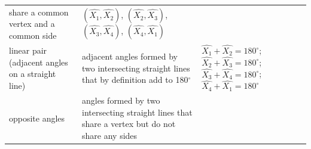 {\begin{center}
\begin{xtabular*}{\mytablewidth}[t]{|p{10\mystarwidth}|p{10\mystarwidth}|p{10\mystarwidth}|}
        share a common vertex and a common side &
        $\left(\hat{{X}_{1}},\hat{{X}_{2}}\right)$, \begin{math}\left(\hat{{X}_{2}},\hat{{X}_{3}}\right)\end{math}, \begin{math}\left(\hat{{X}_{3}},\hat{{X}_{4}}\right)\end{math}, \begin{math}\left(\hat{{X}_{4}},\hat{{X}_{1}}\right)\end{math}%
     \tabularnewline{}
        linear pair (adjacent angles on a straight line) &
        adjacent angles formed by two intersecting straight lines that by definition add to 180${}^{\circ }$ &
                  $\hat{{X}_{1}}+\hat{{X}_{2}}={180}^{\circ }$;
                  $\hat{{X}_{2}}+\hat{{X}_{3}}={180}^{\circ }$;
                  $\hat{{X}_{3}}+\hat{{X}_{4}}={180}^{\circ }$;
                  $\hat{{X}_{4}}+\hat{{X}_{1}}={180}^{\circ }$
     \tabularnewline{}
        opposite angles &
        angles formed by two intersecting straight lines that share a vertex but do not share any sides &

\end{xtabular*}
\end{center}}
